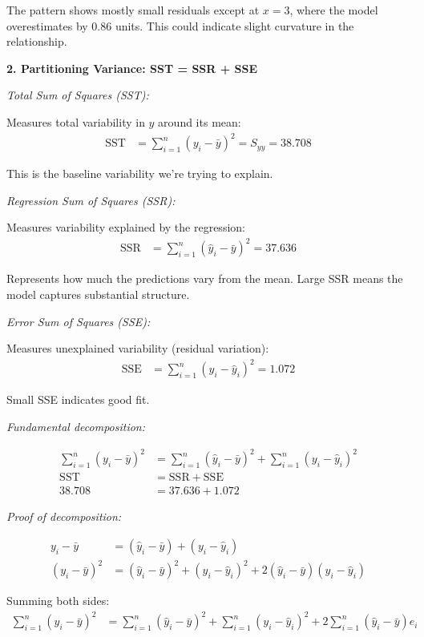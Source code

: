 \documentclass[12pt]{article}
\begin{document}
\begin{explanation}
The pattern shows mostly small residuals except at $x = 3$, where the model overestimates by 0.86 units. This could indicate slight curvature in the relationship.

\textbf{2. Partitioning Variance: SST = SSR + SSE}

\textit{Total Sum of Squares (SST):}

Measures total variability in $y$ around its mean:
\begin{align*}
\text{SST} &= \sum_{i=1}^{n}(y_i - \bar{y})^2 = S_{yy} = 38.708
\end{align*}

This is the baseline variability we're trying to explain.

\textit{Regression Sum of Squares (SSR):}

Measures variability explained by the regression:
\begin{align*}
\text{SSR} &= \sum_{i=1}^{n}(\hat{y}_i - \bar{y})^2 = 37.636
\end{align*}

Represents how much the predictions vary from the mean. Large SSR means the model captures substantial structure.

\textit{Error Sum of Squares (SSE):}

Measures unexplained variability (residual variation):
\begin{align*}
\text{SSE} &= \sum_{i=1}^{n}(y_i - \hat{y}_i)^2 = 1.072
\end{align*}

Small SSE indicates good fit.

\textit{Fundamental decomposition:}

\begin{align*}
\sum_{i=1}^{n}(y_i - \bar{y})^2 &= \sum_{i=1}^{n}(\hat{y}_i - \bar{y})^2 + \sum_{i=1}^{n}(y_i - \hat{y}_i)^2 \\
\text{SST} &= \text{SSR} + \text{SSE} \\
38.708 &= 37.636 + 1.072
\end{align*}

\textit{Proof of decomposition:}

\begin{align*}
y_i - \bar{y} &= (\hat{y}_i - \bar{y}) + (y_i - \hat{y}_i) \\
(y_i - \bar{y})^2 &= (\hat{y}_i - \bar{y})^2 + (y_i - \hat{y}_i)^2 + 2(\hat{y}_i - \bar{y})(y_i - \hat{y}_i)
\end{align*}

Summing both sides:
\begin{align*}
\sum_{i=1}^{n}(y_i - \bar{y})^2 &= \sum_{i=1}^{n}(\hat{y}_i - \bar{y})^2 + \sum_{i=1}^{n}(y_i - \hat{y}_i)^2 + 2\sum_{i=1}^{n}(\hat{y}_i - \bar{y})e_i
\end{align*}


\end{explanation}
\end{document}
